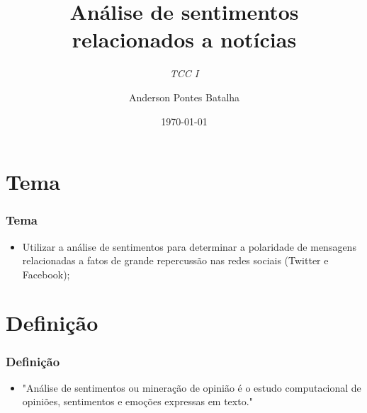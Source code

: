 \documentclass{beamer}
\title[Sistemas de Informação]{\textbf{Análise de sentimentos\\ relacionados a notícias}} %
\subtitle{\textit{TCC I}}
\institute[IFC]{
Instituto Federal Catarinense -- IFC\\
Campus Araquari \\
}
\author{Anderson Pontes Batalha}
\date{\tiny{\today}}
\begin{document}
\begin{frame}
    \maketitle
\end{frame}


\section{Tema}
\begin{frame}%
\frametitle{\textbf{Tema}\transdissolve}%
\begin{itemize}%
\item<1-> Utilizar a análise de sentimentos para determinar a polaridade de mensagens relacionadas a fatos de grande repercussão nas redes sociais (Twitter e Facebook);
\end{itemize}
\end{frame}

\section{Definição}
\begin{frame}%
\frametitle{\textbf{Definição}\transdissolve}%
\begin{itemize}%
\item<1-> "Análise de sentimentos ou mineração de opinião é o estudo computacional de opiniões, sentimentos e emoções expressas em texto."
\end{itemize}
\end{frame}
\end{document}
